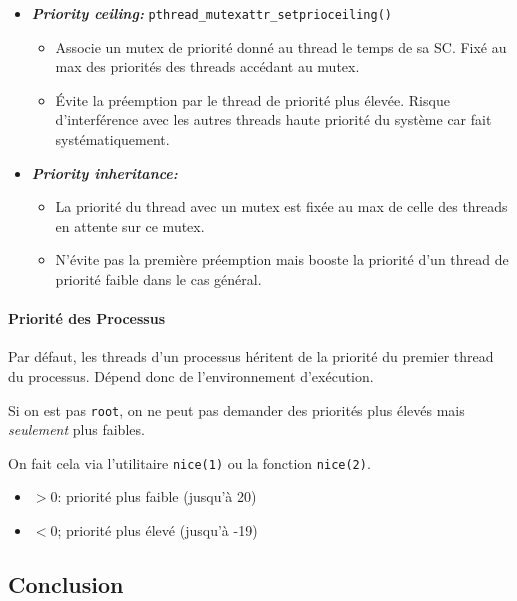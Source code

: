 \begin{itemize}
\tightlist
\item
  \textbf{\emph{Priority ceiling:}}
  \texttt{pthread\_mutexattr\_setprioceiling()}

  \begin{itemize}
  \tightlist
  \item
    Associe un mutex de priorité donné au thread le temps de sa SC. Fixé
    au max des priorités des threads accédant au mutex.
  \item
    Évite la préemption par le thread de priorité plus élevée. Risque
    d'interférence avec les autres threads haute priorité du système car
    fait systématiquement.
  \end{itemize}
\item
  \textbf{\emph{Priority inheritance:}}

  \begin{itemize}
  \tightlist
  \item
    La priorité du thread avec un mutex est fixée au max de celle des
    threads en attente sur ce mutex.
  \item
    N'évite pas la première préemption mais booste la priorité d'un
    thread de priorité faible dans le cas général.
  \end{itemize}
\end{itemize}

\paragraph{Priorité des Processus}\label{priorituxe9-des-processus}

Par défaut, les threads d'un processus héritent de la priorité du
premier thread du processus. Dépend donc de l'environnement d'exécution.

Si on est pas \texttt{root}, on ne peut pas demander des priorités plus
élevés mais \emph{seulement} plus faibles.

On fait cela via l'utilitaire \texttt{nice(1)} ou la fonction
\texttt{nice(2)}.

\begin{itemize}
\tightlist
\item
  \(>0\): priorité plus faible (jusqu'à 20)
\item
  \(<0\); priorité plus élevé (jusqu'à -19)
\end{itemize}

\subsection{Conclusion}\label{conclusion}

